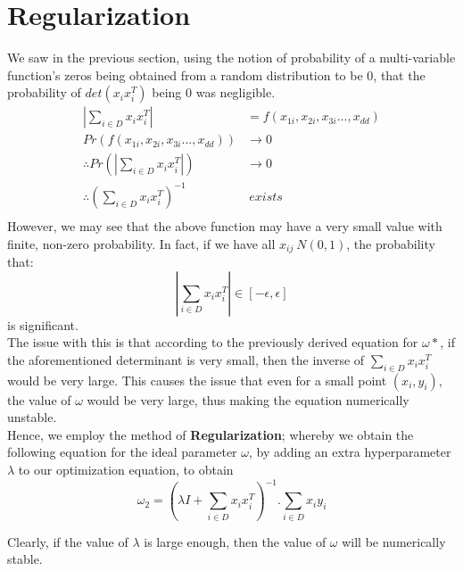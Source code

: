 \documentclass[11pt, twosides]{article}
\begin{document}
{\section{Regularization}
We saw in the previous section, using the notion of probability of a multi-variable function's zeros being obtained from a random distribution to be $0$, that the probability of $det(x_ix_i^T)$ being $0$ was negligible.
\color{blue}
\begin{align*}
    |\sum_{i \in D} x_ix_i^T| &= f(x_{1i},x_{2i},x_{3i}...,x_{dd})\\
    Pr(f(x_{1i},x_{2i},x_{3i}...,x_{dd})) &\rightarrow 0\\
    \therefore Pr(|\sum_{i \in D} x_ix_i^T|) &\rightarrow 0\\
    \therefore (\sum_{i \in D}x_ix_i^T)^{-1}\ &\ exists\\
\end{align*}
\color{black}
However, we may see that the above function may have a very small value with finite, non-zero probability. In fact, if we have all $x_{ij} ~ N(0,1)$, the probability that: 
\color{blue}
\begin{equation*}
|\sum_{i \in D} x_ix_i^T| \in [-\epsilon,\epsilon]\end{equation*}
\color{black} is significant.\\

The issue with this is that according to the previously derived equation for $\omega*$, if the aforementioned determinant is very small, then the inverse of $\sum_{i \in D} x_ix_i^T$ would be very large. This causes the issue that even for a small point $(x_i, y_i)$, the value of $\omega$ would be very large, thus making the equation numerically unstable.\\

Hence, we employ the method of {\bf Regularization}; whereby we obtain the following equation for the ideal parameter $\omega$, by adding an extra hyperparameter $\lambda$ to our optimization equation, to obtain\\
\begin{equation*}
    \omega_2 = (\lambda I + \sum_{i \in D} x_ix_i^T)^{-1} . \sum_{i \in D} x_iy_i
\end{equation*}

Clearly, if the value of $\lambda$ is large enough, then the value of $\omega$ will be numerically stable.\\

}
\end{document}
